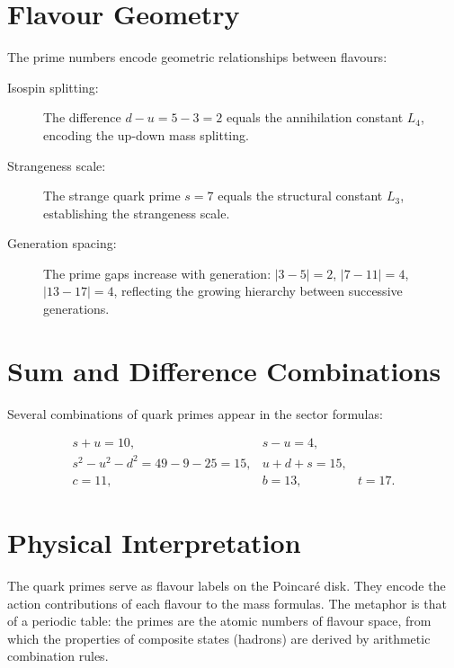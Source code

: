 \section{Flavour Geometry}

The prime numbers encode geometric relationships between flavours:

\begin{description}
\item[Isospin splitting:] The difference \(d - u = 5 - 3 = 2\) equals the
annihilation constant \(L_4\), encoding the up-down mass splitting.
\item[Strangeness scale:] The strange quark prime \(s = 7\) equals the
structural constant \(L_3\), establishing the strangeness scale.
\item[Generation spacing:] The prime gaps increase with generation:
\(|3-5| = 2\), \(|7-11| = 4\), \(|13-17| = 4\), reflecting the growing
hierarchy between successive generations.
\end{description}

\section{Sum and Difference Combinations}

Several combinations of quark primes appear in the sector formulas:

\[
\begin{array}{lcl}
s+u = 10, & s-u = 4, \\
s^2 - u^2 - d^2 = 49 - 9 - 25 = 15, & u+d+s = 15, \\
c = 11, & b = 13, & t = 17.
\end{array}
\]

\section{Physical Interpretation}

The quark primes serve as flavour labels on the Poincar\'{e} disk.  They
encode the action contributions of each flavour to the mass formulas.  The
metaphor is that of a periodic table: the primes are the atomic numbers of
flavour space, from which the properties of composite states (hadrons) are
derived by arithmetic combination rules.
